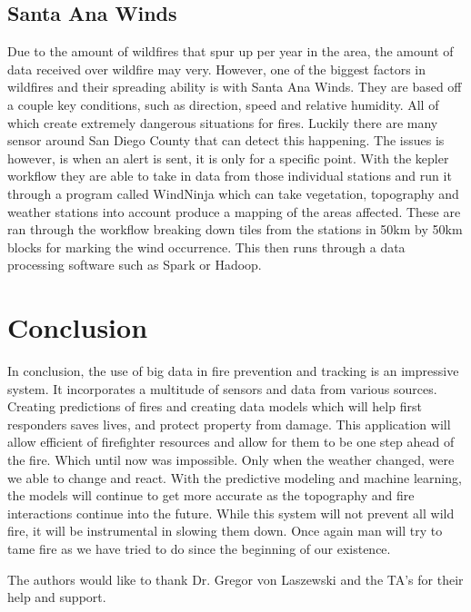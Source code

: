 \documentclass[sigconf]{acmart}
\begin{document}
\subsection{Santa Ana Winds}
Due to the amount of wildfires that spur up per year in the area, the amount of data received over wildfire may very.   However, one of the biggest factors in wildfires and their spreading ability is with Santa Ana Winds.  They are based off a couple key conditions, such as direction, speed and  relative humidity.  All of which create extremely dangerous situations for fires.  Luckily there are many sensor around San Diego County that can detect this happening.  The issues is however, is when an alert is sent, it is only for a specific point.  With the kepler workflow they are able to take in data from those individual stations and run it through a program called WindNinja which can take vegetation, topography and weather stations into account produce a mapping of the areas affected.  These are ran through the workflow breaking down tiles from the stations in 50km by 50km blocks for marking the wind occurrence.  This then runs through a data processing software such as Spark or Hadoop.  

\section{Conclusion}
In conclusion, the use of big data in fire prevention and tracking is an impressive system.   It incorporates a multitude of sensors and data from various sources.  Creating predictions of fires and creating data models which will help first responders saves lives, and protect property from damage.  This application will allow efficient of firefighter resources and allow for them to be one step ahead of the fire.  Which until now was impossible.  Only when the weather changed, were we able to change and react.   With the predictive modeling and machine learning, the models will continue to get more accurate as the topography and fire interactions continue into the future.  While this system will not prevent all wild fire, it will be instrumental in slowing them down.  Once again man will try to tame fire as we have tried to do since the beginning of our existence. 

 

\begin{acks}
The authors would like to thank Dr. Gregor von Laszewski and the TA's for their help and support.
\end{acks}


\end{document}
